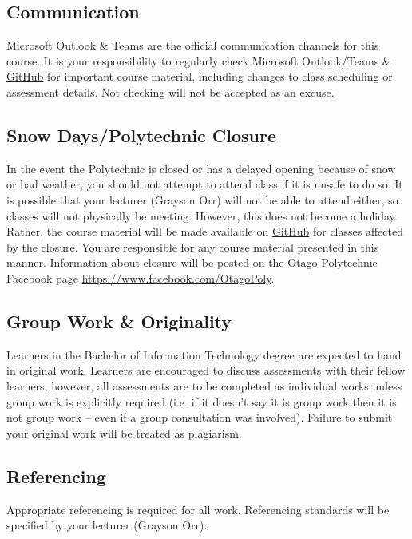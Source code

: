 \documentclass{article}
\begin{document}
\subsection*{Communication}
Microsoft Outlook \& Teams are the official communication channels for this course. It is your responsibility to regularly check Microsoft Outlook/Teams \& \href{https://github.com/otago-polytechnic-bit-courses/IN721-mobile-app-dev}{GitHub} for important course material, including changes to class scheduling or assessment details. Not checking will not be accepted as an excuse.

\subsection*{Snow Days/Polytechnic Closure}
In the event the Polytechnic is closed or has a delayed opening because of snow or bad weather, you should not attempt to attend class if it is unsafe to do so. It is possible that your lecturer (Grayson Orr) will not be able to attend either, so classes will not physically be meeting. However, this does not become a holiday. Rather, the course material will be made available on \href{https://github.com/otago-polytechnic-bit-courses/IN721-mobile-app-dev}{GitHub} for classes affected by the closure. You are responsible for any course material presented in this manner. Information about closure will be posted on the Otago Polytechnic Facebook page \href{https://www.facebook.com/OtagoPoly}{https://www.facebook.com/OtagoPoly}.

\subsection*{Group Work \& Originality}
Learners in the Bachelor of Information Technology degree are expected to hand in original work. Learners are encouraged to discuss assessments with their fellow learners, however, all assessments are to be completed as individual works unless group work is explicitly required (i.e. if it doesn’t say it is group work then it is not group work – even if a group consultation was involved). Failure to submit your original work will be treated as plagiarism.

\subsection*{Referencing}
Appropriate referencing is required for all work. Referencing standards will be specified by your lecturer (Grayson Orr).
\end{document}
